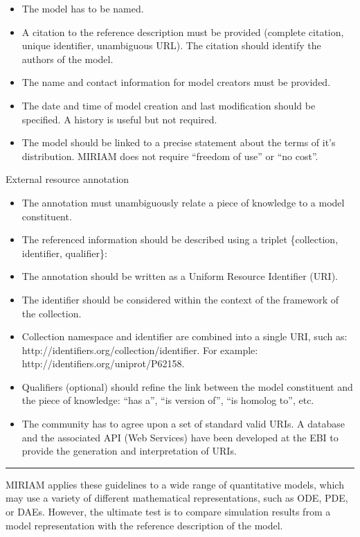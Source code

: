 \documentclass[]{article}
\begin{document}
\begin{itemize}
\item
  The model has to be named.
\item
  A citation to the reference description must be provided (complete
  citation, unique identifier, unambiguous URL). The citation should
  identify the authors of the model.
\item
  The name and contact information for model creators must be provided.
\item
  The date and time of model creation and last modification should be
  specified. A history is useful but not required.
\item
  The model should be linked to a precise statement about the terms of
  it's distribution. MIRIAM does not require ``freedom of use'' or ``no
  cost''.
\end{itemize}
External resource annotation

\begin{itemize}
\item
  The annotation must unambiguously relate a piece of knowledge to a
  model constituent.
\item
  The referenced information should be described using a triplet
  \{collection, identifier, qualifier\}:
\item
  The annotation should be written as a Uniform Resource Identifier
  (URI).
\item
  The identifier should be considered within the context of the
  framework of the collection.
\item
  Collection namespace and identifier are combined into a single URI,
  such as: http://identifiers.org/collection/identifier. For example:
  http://identifiers.org/uniprot/P62158.
\item
  Qualifiers (optional) should refine the link between the model
  constituent and the piece of knowledge: ``has a'', ``is version of'',
  ``is homolog to'', etc.
\item
  The community has to agree upon a set of standard valid URIs. A
  database and the associated API (Web Services) have been developed at
  the EBI to provide the generation and interpretation of URIs.
\end{itemize}
\begin{center}\rule{3in}{0.4pt}\end{center}

MIRIAM applies these guidelines to a wide range of quantitative models,
which may use a variety of different mathematical representations, such
as ODE, PDE, or DAEs. However, the ultimate test is to compare
simulation results from a model representation with the reference
description of the model.
\end{document}
